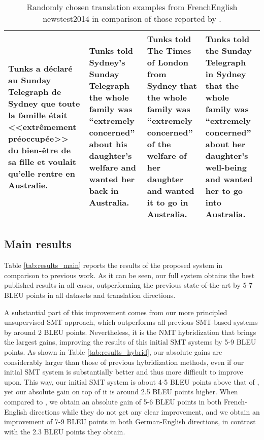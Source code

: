 \documentclass[11pt,a4paper]{article}
\begin{document}
\begin{table*}[t]
\begin{small}
\begin{center}
\begin{tabular}{p{3.82cm}p{3.46cm}p{3.48cm}p{3.67cm}}
    \\
    \midrule
	Tunks a déclaré au Sunday Telegraph de Sydney que toute la famille était <<extrêmement préoccupée>> du bien-être de sa fille et voulait qu'elle rentre en Australie.
	& Tunks told Sydney's Sunday Telegraph the whole family was ``extremely concerned'' about his daughter's welfare and wanted her back in Australia.
	& Tunks told The Times of London from Sydney that the whole family was ``extremely concerned'' of the welfare of her daughter and wanted it to go in Australia.
	& Tunks told the Sunday Telegraph in Sydney that the whole family was ``extremely concerned'' about her daughter's well-being and wanted her to go into Australia.
	\\
    \bottomrule
  \end{tabular}
\end{center}
\end{small}
\caption{Randomly chosen translation examples from FrenchEnglish newstest2014 in comparison of those reported by \citet{artetxe2018usmt}.} \label{tab:examples}
\end{table*}


\subsection{Main results} \label{subsec:results_main}

Table \ref{tab:results_main} reports the results of the proposed system in comparison to previous work. As it can be seen, our full system obtains the best published results in all cases, outperforming the previous state-of-the-art by 5-7 BLEU points in all datasets and translation directions.

A substantial part of this improvement comes from our more principled unsupervised SMT approach, which outperforms all previous SMT-based systems by around 2 BLEU points. Nevertheless, it is the NMT hybridization that brings the largest gains, improving the results of this initial SMT systems by 5-9 BLEU points. As shown in Table \ref{tab:results_hybrid}, our absolute gains are considerably larger than those of previous hybridization methods, even if our initial SMT system is substantially better and thus more difficult to improve upon. This way, our initial SMT system is about 4-5 BLEU points above that of \citet{marie2018unsupervised}, yet our absolute gain on top of it is around 2.5 BLEU points higher. When compared to \citet{lample2018phrase}, we obtain an absolute gain of 5-6 BLEU points in both French-English directions while they do not get any clear improvement, and we obtain an improvement of 7-9 BLEU points in both German-English directions, in contrast with the 2.3 BLEU points they obtain.
\end{document}
